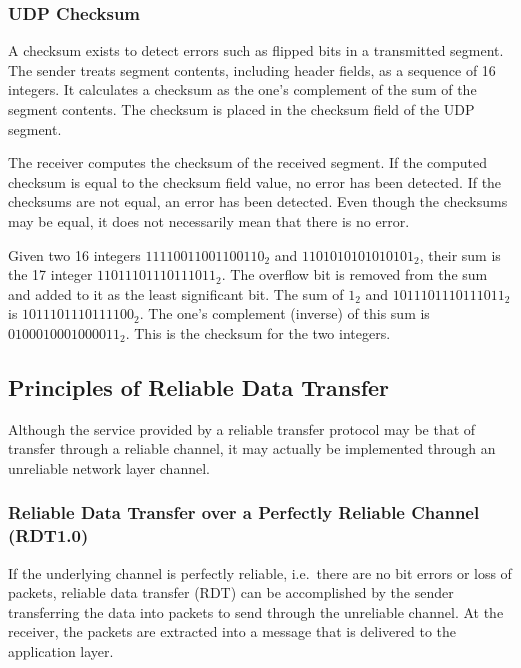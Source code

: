 \subsubsection{UDP Checksum}

A checksum exists to detect errors such as flipped bits in a transmitted segment.
The sender treats segment contents, including header fields, as a sequence of \SI{16}{\bit} integers.
It calculates a checksum as the one's complement of the sum of the segment contents.
The checksum is placed in the checksum field of the UDP segment.

The receiver computes the checksum of the received segment.
If the computed checksum is equal to the checksum field value, no error has been detected.
If the checksums are not equal, an error has been detected.
Even though the checksums may be equal, it does not necessarily mean that there is no error.

Given two \SI{16}{\bit} integers \(11110011001100110_2\) and \(1101010101010101_2\), their sum is the \SI{17}{\bit} integer \(11011101110111011_2\).
The overflow bit is removed from the sum and added to it as the least significant bit.
The sum of \(1_2\) and \(1011101110111011_2\) is \(1011101110111100_2\).
The one's complement (inverse) of this sum is \(0100010001000011_2\).
This is the checksum for the two integers.

\subsection{Principles of Reliable Data Transfer}

Although the service provided by a reliable transfer protocol may be that of transfer through a reliable channel, it may actually be implemented through an unreliable network layer channel.

\subsubsection[RDT over a Perfectly Reliable Channel (RDT1.0)]{Reliable Data Transfer over a Perfectly Reliable Channel (RDT1.0)}

If the underlying channel is perfectly reliable, i.e.\ there are no bit errors or loss of packets, reliable data transfer (RDT) can be accomplished by the sender transferring the data into packets to send through the unreliable channel.
At the receiver, the packets are extracted into a message that is delivered to the application layer.


